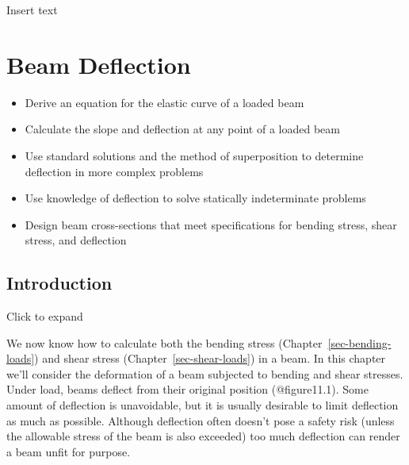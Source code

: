 \documentclass[
  letterpaper,
  DIV=11,
  numbers=noendperiod]{scrreprt}
\providecommand{\tightlist}{%
  \setlength{\itemsep}{0pt}\setlength{\parskip}{0pt}}\usepackage{longtable,booktabs,array}
\begin{document}
Insert text


\chapter{Beam Deflection}\label{sec-beam-deflection}

\begin{tcolorbox}[enhanced jigsaw, colbacktitle=quarto-callout-note-color!10!white, title={Learning Objectives}, coltitle=black, leftrule=.75mm, rightrule=.15mm, opacityback=0, breakable, colframe=quarto-callout-note-color-frame, left=2mm, arc=.35mm, colback=white, bottomrule=.15mm, bottomtitle=1mm, toptitle=1mm, titlerule=0mm, opacitybacktitle=0.6, toprule=.15mm]

\begin{itemize}
\tightlist
\item
  Derive an equation for the elastic curve of a loaded beam
\item
  Calculate the slope and deflection at any point of a loaded beam
\item
  Use standard solutions and the method of superposition to determine
  deflection in more complex problems
\item
  Use knowledge of deflection to solve statically indeterminate problems
\item
  Design beam cross-sections that meet specifications for bending
  stress, shear stress, and deflection
\end{itemize}

\end{tcolorbox}

\section*{Introduction}\label{introduction-11}


Click to expand

We now know how to calculate both the bending stress
(Chapter~\ref{sec-bending-loads}) and shear stress
(Chapter~\ref{sec-shear-loads}) in a beam. In this chapter we'll
consider the deformation of a beam subjected to bending and shear
stresses. Under load, beams deflect from their original position
(@figure11.1). Some amount of deflection is unavoidable, but it is
usually desirable to limit deflection as much as possible. Although
deflection often doesn't pose a safety risk (unless the allowable stress
of the beam is also exceeded) too much deflection can render a beam
unfit for purpose.
\end{document}
